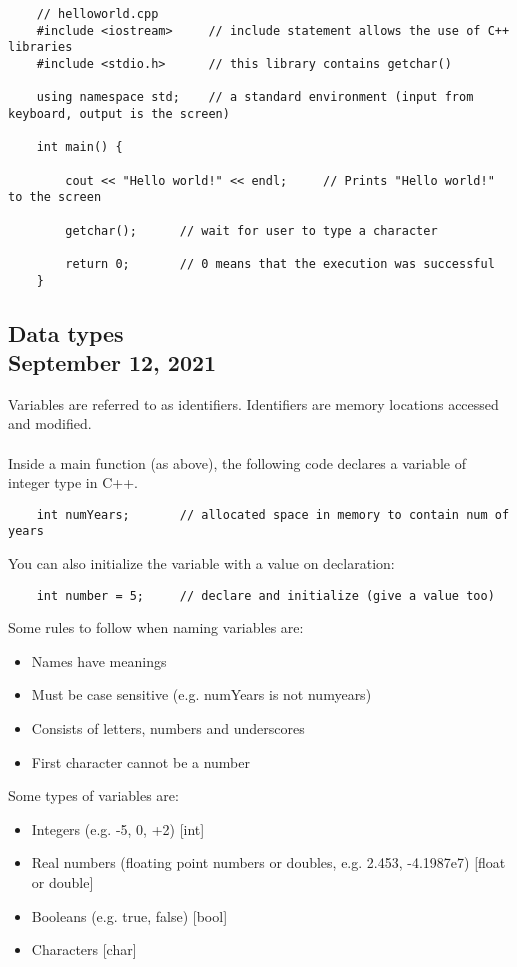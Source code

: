 \documentclass[]{article}
\begin{document}
\begin{lstlisting}
	// helloworld.cpp
	#include <iostream>		// include statement allows the use of C++ libraries
	#include <stdio.h>		// this library contains getchar()
	
	using namespace std;	// a standard environment (input from keyboard, output is the screen)
	
	int main() {
		
		cout << "Hello world!" << endl;		// Prints "Hello world!" to the screen
		
		getchar();      // wait for user to type a character
		
		return 0;		// 0 means that the execution was successful
	}
\end{lstlisting}
\bigbreak

\subsection{Data types\\ {\large \normalfont September 12, 2021}}
\bigbreak

Variables are referred to as identifiers. Identifiers are memory locations accessed and modified. \\\\
Inside a main function (as above), the following code declares a variable of integer type in C++. 

\begin{lstlisting}
	int numYears;       // allocated space in memory to contain num of years
\end{lstlisting}
\bigbreak

You can also initialize the variable with a value on declaration:
\begin{lstlisting}	
	int number = 5;     // declare and initialize (give a value too)
\end{lstlisting}
\bigbreak

Some rules to follow when naming variables are:
\begin{itemize}
	\item Names have meanings
	\item Must be case sensitive (e.g. numYears is not numyears)
	\item Consists of letters, numbers and underscores
	\item First character cannot be a number
\end{itemize}
\bigbreak

Some types of variables are:
\begin{itemize}
	\item Integers (e.g. -5, 0, +2) [int]
	\item Real numbers (floating point numbers or doubles, e.g. 2.453, -4.1987e7) [float or double]
	\item Booleans (e.g. true, false) [bool]
	\item Characters [char]
\end{itemize}	    
\bigbreak
\end{document}
